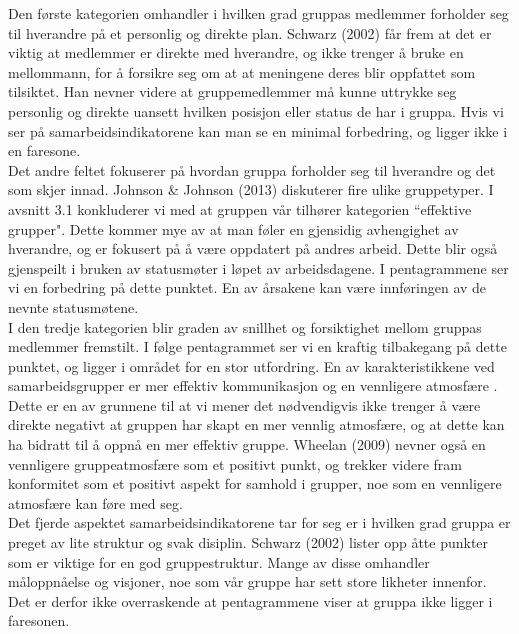 Den første kategorien omhandler i hvilken grad gruppas medlemmer forholder seg til hverandre på et personlig og direkte plan. Schwarz (2002)\cite{fasilitator} får frem at det er viktig at medlemmer er direkte med hverandre, og ikke trenger å bruke en mellommann, for å forsikre seg om at at meningene deres blir oppfattet som tilsiktet. Han nevner videre at gruppemedlemmer må kunne uttrykke seg personlig og direkte uansett hvilken posisjon eller status de har i gruppa. Hvis vi ser på samarbeidsindikatorene kan man se en minimal forbedring, og ligger ikke i en faresone.\\

Det andre feltet fokuserer på hvordan gruppa forholder seg til hverandre og det som skjer innad. Johnson \& Johnson (2013)\cite{gruppeteori} diskuterer fire ulike gruppetyper. I avsnitt 3.1 konkluderer vi med at gruppen vår tilhører kategorien ``effektive grupper". Dette kommer mye av at man føler en gjensidig avhengighet av hverandre, og er fokusert på å være oppdatert på andres arbeid. Dette blir også gjenspeilt i bruken av statusmøter i løpet av arbeidsdagene. I pentagrammene ser vi en forbedring på dette punktet. En av årsakene kan være innføringen av de nevnte statusmøtene.\\

I den tredje kategorien blir graden av snillhet og forsiktighet mellom gruppas medlemmer fremstilt. I følge pentagrammet ser vi en kraftig tilbakegang på dette punktet, og ligger i området for en stor utfordring. En av karakteristikkene ved samarbeidsgrupper er mer effektiv kommunikasjon og en vennligere atmosfære \cite{fasilitator}. Dette er en av grunnene til at vi mener det nødvendigvis ikke trenger å være direkte negativt at gruppen har skapt en mer vennlig atmosfære, og at dette kan ha bidratt til å oppnå en mer effektiv gruppe. Wheelan (2009)\cite{effectiveTeams} nevner også en vennligere gruppeatmosfære som et positivt punkt, og trekker videre fram konformitet som et positivt aspekt for samhold i grupper, noe som en vennligere atmosfære kan føre med seg.\\

Det fjerde aspektet samarbeidsindikatorene tar for seg er i hvilken grad gruppa er preget av lite struktur og svak disiplin. Schwarz (2002)\cite{fasilitator} lister opp åtte punkter som er viktige for en god gruppestruktur. Mange av disse omhandler måloppnåelse og visjoner, noe som vår gruppe har sett store likheter innenfor. Det er derfor ikke overraskende at pentagrammene viser at gruppa ikke ligger i faresonen.\\

